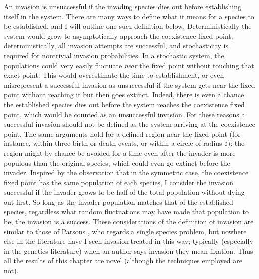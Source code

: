 An invasion is unsuccessful if the invading species dies out before establishing itself in the system. 
There are many ways to define what it means for a species to be established, and I will outline one such definition below. 
Deterministically the system would grow to asymptotically approach the coexistence fixed point; deterministically, all invasion attempts are successful, and stochasticity is required for nontrivial invasion probabilities. 
In a stochastic system, the populations could very easily fluctuate \emph{near} the fixed point without touching that exact point. 
This would overestimate the time to establishment, or even misrepresent a successful invasion as unsuccessful if the system gets near the fixed point without reaching it but then goes extinct. 
Indeed, there is even a chance the established species dies out before the system reaches the coexistence fixed point, which would be counted as an unsuccessful invasion. 
For these reasons a successful invasion should not be defined as the system arriving at the coexistence point. 
The same arguments hold for a defined region near the fixed point (for instance, within three birth or death events, or within a circle of radius $\varepsilon$): the region might by chance be avoided for a time even after the invader is more populous than the original species, which could even go extinct before the invader. 
Inspired by the observation that in the symmetric case, the coexistence fixed point has the same population of each species, I consider the invasion successful if the invader grows to be half of the total population without dying out first. 
So long as the invader population matches that of the established species, regardless what random fluctuations may have made that population to be, the invasion is a success. %
These considerations of the definition of invasion are similar to those of Parsons \cite{Parsons2018}, who regards a single species problem, but nowhere else in the literature have I seen invasion treated in this way; typically (especially in the genetics literature) when an author says invasion they mean fixation. 
Thus all the results of this chapter are novel (although the techniques employed are not). 

